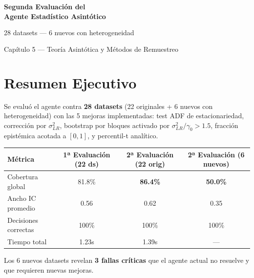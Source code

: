 \documentclass[12pt,a4paper]{article}
\begin{document}
\begin{titlepage}
    \centering\vspace*{3cm}
    {\Huge\bfseries Segunda Evaluación del\\Agente Estadístico Asintótico\par}
    \vspace{0.5cm}
    {\Large 28 datasets --- 6 nuevos con heterogeneidad\par}
    \vspace{1.5cm}
    {\large Capítulo 5 --- Teoría Asintótica y Métodos de Remuestreo\par}
    \vspace{1cm}{\large\bfseries Inferencia Estadística para Agentes Inteligentes\par}
    \vspace{2cm}{\large Versión 2.0.0 --- Mayo 2026\par}\vfill
\end{titlepage}

\tableofcontents\newpage

\section{Resumen Ejecutivo}

Se evaluó el agente contra \textbf{28 datasets} (22 originales + 6 nuevos con heterogeneidad) con las 5 mejoras implementadas: test ADF de estacionariedad, corrección por $\sigma^2_{LR}$, bootstrap por bloques activado por $\sigma^2_{LR}/\gamma_0 > 1.5$, fracción epistémica acotada a $[0,1]$, y percentil-t analítico.

\begin{center}
\begin{tabular}{@{}lccc@{}}
\toprule
Métrica & 1ª Evaluación (22 ds) & 2ª Evaluación (22 orig) & 2ª Evaluación (6 nuevos) \\
\midrule
Cobertura global & 81.8\% & \textbf{86.4\%} & \textbf{50.0\%} \\
Ancho IC promedio & 0.56 & 0.62 & 0.35 \\
Decisiones correctas & 100\% & 100\% & 100\% \\
Tiempo total & 1.23s & 1.39s & --- \\
\bottomrule
\end{tabular}
\end{center}

Los 6 nuevos datasets revelan \textbf{3 fallas críticas} que el agente actual no resuelve y que requieren nuevas mejoras.
\end{document}
